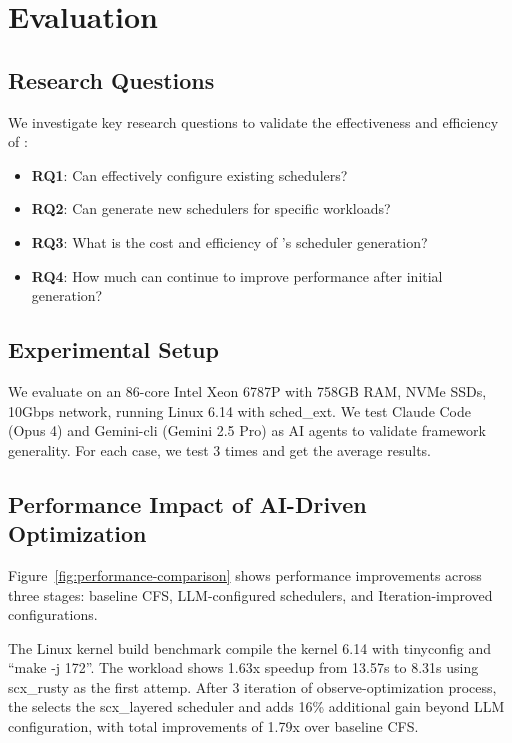 \section{Evaluation}
\label{sec:evaluation}

\subsection{Research Questions}

We investigate key research questions to validate the effectiveness and efficiency of \sys:

\begin{itemize}
\item \textbf{RQ1}: Can \sys effectively configure existing schedulers?
\item \textbf{RQ2}: Can \sys generate new schedulers for specific workloads?
\item \textbf{RQ3}: What is the cost and efficiency of \sys's scheduler generation?
\item \textbf{RQ4}: How much can \agent continue to improve performance after initial generation?
\end{itemize}

\subsection{Experimental Setup}

We evaluate \sys on an 86-core Intel Xeon 6787P with 758GB RAM, NVMe SSDs, 10Gbps network, running Linux 6.14 with sched\_ext. We test Claude Code (Opus 4) and Gemini-cli (Gemini 2.5 Pro) as AI agents to validate framework generality. For each case, we test 3 times and get the average results.

\subsection{Performance Impact of AI-Driven Optimization}

Figure~\ref{fig:performance-comparison} shows performance improvements across three stages: baseline CFS, LLM-configured schedulers, and Iteration-improved configurations. 


The Linux kernel build benchmark compile the kernel 6.14 with tinyconfig and ``make -j 172''. The workload shows 1.63x speedup from 13.57s to 8.31s using scx\_rusty as the first attemp. After 3 iteration of observe-optimization process, the \agent selects the scx\_layered scheduler and adds 16\% additional gain beyond LLM configuration, with total improvements of 1.79x over baseline CFS.

